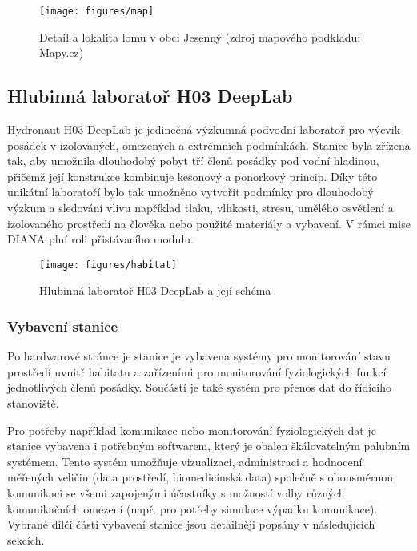 \begin{figure}[h]
    \begin{center}
        \texttt{[image: figures/map]}
        \caption{Detail a lokalita lomu v obci Jesenný (zdroj mapového podkladu: Mapy.cz)}
        \label{fig:map}
    \end{center}
\end{figure}

\subsection{Hlubinná laboratoř H03 DeepLab}
\label{subsubsec:h03_deeplab}
Hydronaut H03 DeepLab je jedinečná výzkumná podvodní laboratoř pro výcvik
posádek v izolovaných, omezených a extrémních podmínkách. Stanice byla zřízena
tak, aby umožnila dlouhodobý pobyt tří členů posádky pod vodní hladinou, přičemž
její konstrukce kombinuje kesonový a ponorkový princip. Díky této unikátní
laboratoří bylo tak umožněno vytvořit podmínky pro dlouhodobý výzkum a sledování
vlivu například tlaku, vlhkosti, stresu, umělého osvětlení a izolovaného
prostředí na člověka nebo použité materiály a vybavení. V rámci mise DIANA plní
roli přistávacího modulu.

\begin{figure}[h]
    \begin{center}
        \texttt{[image: figures/habitat]}
        \caption{Hlubinná laboratoř H03 DeepLab a její schéma}
        \label{fig:habitat}
    \end{center}
\end{figure}

\subsubsection{Vybavení stanice}
\label{subsubsec:vybaveni_stanice}
Po hardwarové stránce je stanice je vybavena systémy pro monitorování stavu
prostředí uvnitř habitatu a zařízeními pro monitorování fyziologických funkcí
jednotlivých členů posádky. Součástí je také systém pro přenos dat do řídícího
stanoviště.

Pro potřeby například komunikace nebo monitorování fyziologických dat je stanice
vybavena i potřebným softwarem, který je obalen škálovatelným palubním systémem.
Tento systém umožňuje vizualizaci, administraci a hodnocení měřených veličin
(data prostředí, biomedicínská data) společně s obousměrnou komunikaci se všemi
zapojenými účastníky s možností volby různých komunikačních omezení (např. pro
potřeby simulace výpadku komunikace). Vybrané dílčí částí vybavení stanice jsou
detailněji popsány v následujících sekcích.

